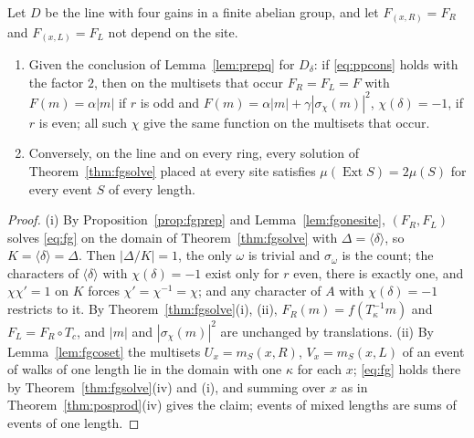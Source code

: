 \begin{theorem}\label{thm:fgline}
Let $D$ be the line with four gains in a finite abelian group, and let $F_{(x,R)}=F_R$ and $F_{(x,L)}=F_L$ not depend on the site.
\begin{enumerate}[label=(\roman*)]
\item Given the conclusion of Lemma~\ref{lem:prepq} for $D_\delta$: if \eqref{eq:ppcons} holds with the factor $2$, then on the multisets that occur $F_R=F_L=F$ with $F(m)=\alpha|m|$ if $r$ is odd and $F(m)=\alpha|m|+\gamma|\sigma_\chi(m)|^2$, $\chi(\delta)=-1$, if $r$ is even; all such $\chi$ give the same function on the multisets that occur.
\item Conversely, on the line and on every ring, every solution of Theorem~\ref{thm:fgsolve} placed at every site satisfies $\mu(\operatorname{Ext}S)=2\mu(S)$ for every event $S$ of every length.
\end{enumerate}
\end{theorem}
\begin{proof}
(i) By Proposition~\ref{prop:fgprep} and Lemma~\ref{lem:fgonesite}, $(F_R,F_L)$ solves \eqref{eq:fg} on the domain of Theorem~\ref{thm:fgsolve} with $\Delta=\langle\delta\rangle$, so $K=\langle\delta\rangle=\Delta$. Then $|\Delta/K|=1$, the only $\omega$ is trivial and $\sigma_\omega$ is the count; the characters of $\langle\delta\rangle$ with $\chi(\delta)=-1$ exist only for $r$ even, there is exactly one, and $\chi\chi'=1$ on $K$ forces $\chi'=\chi^{-1}=\chi$; and any character of $A$ with $\chi(\delta)=-1$ restricts to it. By Theorem~\ref{thm:fgsolve}(i), (ii), $F_R(m)=f(T_\kappa^{-1}m)$ and $F_L=F_R\circ T_c$, and $|m|$ and $|\sigma_\chi(m)|^2$ are unchanged by translations. (ii) By Lemma~\ref{lem:fgcoset} the multisets $U_x=m_S(x,R)$, $V_x=m_S(x,L)$ of an event of walks of one length lie in the domain with one $\kappa$ for each $x$; \eqref{eq:fg} holds there by Theorem~\ref{thm:fgsolve}(iv) and (i), and summing over $x$ as in Theorem~\ref{thm:posprod}(iv) gives the claim; events of mixed lengths are sums of events of one length.
\end{proof}


